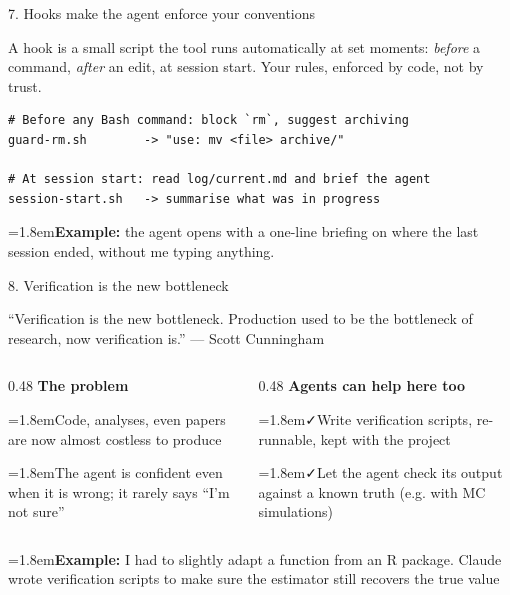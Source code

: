 \documentclass[aspectratio=169, 11pt, t]{beamer}
\newcommand{\yes}{\textcolor{seeblau}{\faCheck}}
\newcommand{\warn}{\textcolor{akzentrot}{\faExclamationTriangle}}
\newcommand{\hint}[2]{\par\noindent\hangindent=1.8em\hangafter=1\textcolor{seeblau}{#1}\quad #2\par}
\begin{document}
\begin{frame}[fragile]{7. Hooks make the agent enforce your conventions}

\small
A hook is a small script the tool runs automatically at set moments: \emph{before} a command, \emph{after} an edit, at session start. Your rules, enforced by code, not by trust.

\begin{lstlisting}
# Before any Bash command: block `rm`, suggest archiving
guard-rm.sh        -> "use: mv <file> archive/"

# At session start: read log/current.md and brief the agent
session-start.sh   -> summarise what was in progress
\end{lstlisting}

\vfill
\hint{\faGraduationCap}{\textbf{Example:} the agent opens with a one-line briefing on where the last session ended, without me typing anything.}

\end{frame}


\begin{frame}{8. Verification is the new bottleneck}

\vfill
\centering\small\textcolor{grau}{\enquote{Verification is the new bottleneck. Production used to be the bottleneck of research, now verification is.} --- Scott Cunningham}

\vfill
\begin{columns}[T]
  \begin{column}{0.48\textwidth}
    \textbf{The problem}\\[0.4em]
    \hint{\warn}{Code, analyses, even papers are now almost costless to produce}
    \hint{\warn}{The agent is confident even when it is wrong; it rarely says \enquote{I'm not sure}}
  \end{column}
  \begin{column}{0.48\textwidth}
    \textbf{Agents can help here too}\\[0.4em]
    \hint{\yes}{Write verification scripts, re-runnable, kept with the project}
    \hint{\yes}{Let the agent check its output against a known truth (e.g. with MC simulations)}
  \end{column}
\end{columns}

\vfill
\hint{\faGraduationCap}{\textbf{Example:} I had to slightly adapt a function from an R package. Claude wrote verification scripts to make sure the estimator still recovers the true value}

\end{frame}
\end{document}
